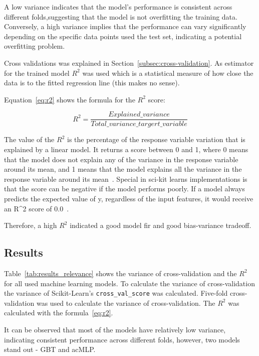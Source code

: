 A low variance indicates that the model's performance is consistent across
different folds,suggesting that the model is not overfitting the training data.
Conversely, a high variance implies that the performance can vary significantly
depending on the specific data points used the test set, indicating a potential
overfitting problem.

Cross validations was explained in Section~\ref{subsec:cross-validation}.
As estimator for the trained model $R^2$ was used which is a statistical measure of how close the
data is to the fitted regression line (this makes no sense).

Equation~\eqref{eq:r2} shows the formula for the $R^2$ score:

\begin{equation}
    \label{eq:r2}
    R^2 = \frac{Explained\_variance}{Total\_variance\_targert\_variable}
\end{equation}

The value of the \(R^2\) is the percentage of the response variable variation that is
explained by a linear model.
It returns a score between 0 and 1, where 0 means that the model does not
explain any of the variance in the response variable around its mean, and 1 means that
the model explains all the variance in the response variable around its mean~\cite[p.
43]{muller_introductionmachinelearning_2016}.
Special in sci-kit learns implementations is that the score can be negative if the model
performs poorly.
If a model always predicts the expected value of y, regardless of the
input features, it would receive an R^2 score of 0.0~\cite{_sklearnmetricsr2_}.

Therefore, a high \(R^2\) indicated a good model fir and good bias-variance
tradeoff\cite[p. 43]{muller_introductionmachinelearning_2016}.

\subsection{Results}\label{subsec:results3}

Table~\ref*{tab:results_relevance} shows the variance of cross-validation
and the \(R^2\) for all used machine learning models.
To calculate the variance of cross-validation the variance of Scikit-Learn's
\texttt{cross\_val\_score} was calculated.
Five-fold cross-validation was used to calculate the variance of
cross-validation.
The \(R^2\) was calculated with the formula~\ref{eq:r2}.

It can be observed that most of the models have relatively low variance, indicating
consistent performance across different folds, however, two models stand out - \ac{GBT}
and ac{MLP}.

